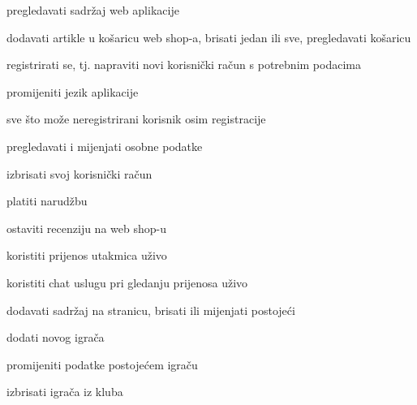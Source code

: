 			
			\begin{packed_enum}
				\item  {}
				
				\begin{packed_enum}
					
					\item pregledavati sadržaj web aplikacije
					\item dodavati artikle u košaricu web shop-a, brisati jedan ili sve, pregledavati košaricu
					\item registrirati se, tj. napraviti novi korisnički račun s potrebnim podacima
					\item promijeniti jezik aplikacije				
				\end{packed_enum}
			
				\item  {}
				
				\begin{packed_enum}
					
					\item sve što može neregistrirani korisnik osim registracije
					\item pregledavati i mijenjati osobne podatke
					\item izbrisati svoj korisnički račun
					\item platiti narudžbu
					\item ostaviti recenziju na web shop-u
					\item koristiti prijenos utakmica uživo
					\item koristiti chat uslugu pri gledanju prijenosa uživo
					
				\end{packed_enum}
			\pagebreak
			\item  {}
			
			\begin{packed_enum}
				
				\item dodavati sadržaj na stranicu, brisati ili mijenjati postojeći
				\item dodati novog igrača
				\item promijeniti podatke postojećem igraču
				\item izbrisati igrača iz kluba
				
			\end{packed_enum}
		\item  {}
		

\end{packed_enum}
